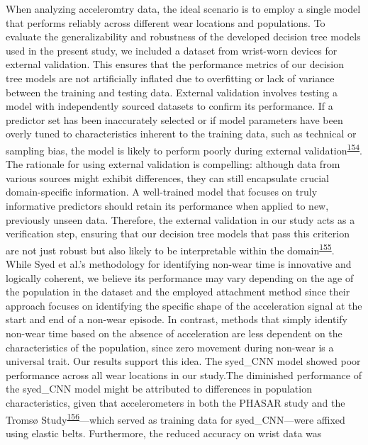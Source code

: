 \documentclass[
  10pt,
]{scrbook}
\begin{document}
When analyzing acceleromtry data, the ideal scenario is to employ a
single model that performs reliably across different wear locations and
populations. To evaluate the generalizability and robustness of the
developed decision tree models used in the present study, we included a
dataset from wrist-worn devices for external validation. This ensures
that the performance metrics of our decision tree models are not
artificially inflated due to overfitting or lack of variance between the
training and testing data. External validation involves testing a model
with independently sourced datasets to confirm its performance. If a
predictor set has been inaccurately selected or if model parameters have
been overly tuned to characteristics inherent to the training data, such
as technical or sampling bias, the model is likely to perform poorly
during external
validation\textsuperscript{\protect\hyperlink{ref-steyerberg_prediction_2016}{154}}.
The rationale for using external validation is compelling: although data
from various sources might exhibit differences, they can still
encapsulate crucial domain-specific information. A well-trained model
that focuses on truly informative predictors should retain its
performance when applied to new, previously unseen data. Therefore, the
external validation in our study acts as a verification step, ensuring
that our decision tree models that pass this criterion are not just
robust but also likely to be interpretable within the
domain\textsuperscript{\protect\hyperlink{ref-altman_prognosis_2009}{155}}.
While Syed et al.'s methodology for identifying non-wear time is
innovative and logically coherent, we believe its performance may vary
depending on the age of the population in the dataset and the employed
attachment method since their approach focuses on identifying the
specific shape of the acceleration signal at the start and end of a
non-wear episode. In contrast, methods that simply identify non-wear
time based on the absence of acceleration are less dependent on the
characteristics of the population, since zero movement during non-wear
is a universal trait. Our results support this idea. The
\textsf{syed\_CNN} model showed poor performance across all wear
locations in our study.The diminished performance of the
\textsf{syed\_CNN} model might be attributed to differences in
population characteristics, given that accelerometers in both the PHASAR
study and the Tromsø
Study\textsuperscript{\protect\hyperlink{ref-sagelv_2019}{156}}---which
served as training data for \textsf{syed\_CNN}---were affixed using
elastic belts. Furthermore, the reduced accuracy on wrist data was
\end{document}
